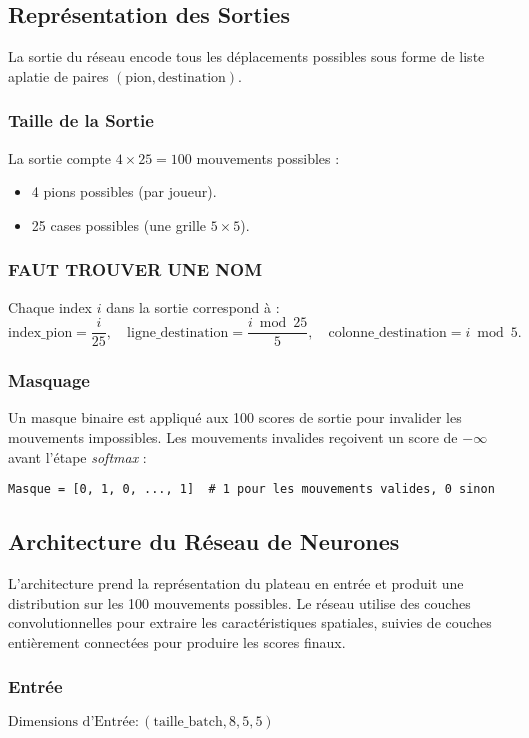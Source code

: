 \documentclass[]{article}
\begin{document}
\subsection{Représentation des Sorties}
La sortie du réseau encode tous les déplacements possibles sous forme de liste aplatie de paires \((\text{pion}, \text{destination})\).

\subsubsection{Taille de la Sortie}
La sortie compte \(4 \times 25 = 100\) mouvements possibles :
\begin{itemize}
    \item 4 pions possibles (par joueur).
    \item 25 cases possibles (une grille \(5 \times 5\)).
\end{itemize}

\subsubsection{FAUT TROUVER UNE NOM} %
Chaque index \(i\) dans la sortie correspond à :
\[
\text{index\_pion} = \frac{i}{25}, \quad
\text{ligne\_destination} = \frac{i \bmod 25}{5}, \quad
\text{colonne\_destination} = i \bmod 5.
\]

\subsubsection{Masquage}
Un masque binaire est appliqué aux 100 scores de sortie pour invalider les mouvements impossibles. Les mouvements invalides reçoivent un score de \(-\infty\) avant l'étape \textit{softmax} :
\begin{verbatim}
Masque = [0, 1, 0, ..., 1]  # 1 pour les mouvements valides, 0 sinon
\end{verbatim}

\subsection{Architecture du Réseau de Neurones}
L'architecture prend la représentation du plateau en entrée et produit une distribution sur les 100 mouvements possibles. Le réseau utilise des couches convolutionnelles pour extraire les caractéristiques spatiales, suivies de couches entièrement connectées pour produire les scores finaux.

\subsubsection{Entrée}
\(\text{Dimensions d'Entrée}: (\text{taille\_batch}, 8, 5, 5)\)
\end{document}

